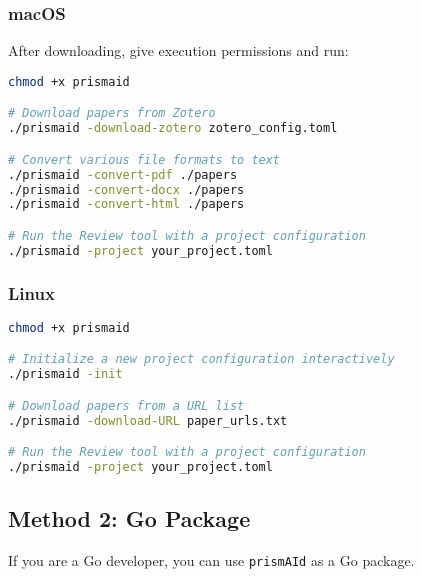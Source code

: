 \subsubsection{macOS}
\begin{commandbox}
After downloading, give execution permissions and run:
\begin{lstlisting}[language=Bash]
chmod +x prismaid

# Download papers from Zotero
./prismaid -download-zotero zotero_config.toml

# Convert various file formats to text
./prismaid -convert-pdf ./papers
./prismaid -convert-docx ./papers
./prismaid -convert-html ./papers

# Run the Review tool with a project configuration
./prismaid -project your_project.toml
\end{lstlisting}
\end{commandbox}

\subsubsection{Linux}
\begin{commandbox}
\begin{lstlisting}[language=Bash]
chmod +x prismaid

# Initialize a new project configuration interactively
./prismaid -init

# Download papers from a URL list
./prismaid -download-URL paper_urls.txt

# Run the Review tool with a project configuration
./prismaid -project your_project.toml
\end{lstlisting}
\end{commandbox}


\subsection{Method 2: Go Package}

If you are a Go developer, you can use \texttt{prismAId} as a Go package.

